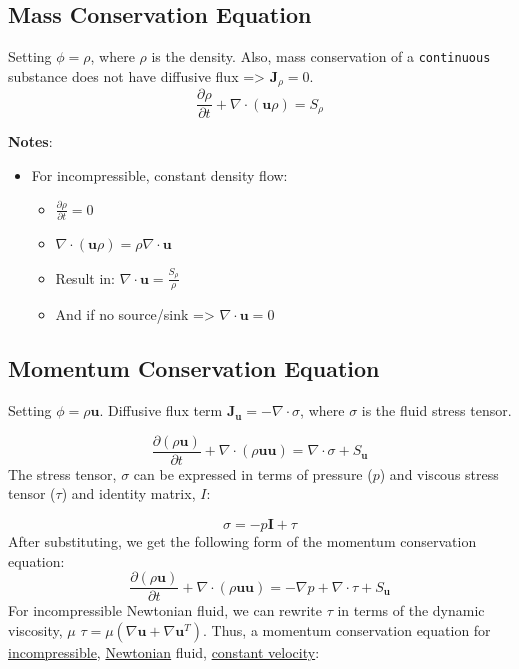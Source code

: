 \documentclass[11pt]{article}
\begin{document}
\subsection{Mass Conservation Equation}
\label{sec:org8221a48}
Setting \(\phi = \rho\), where \(\rho\) is the density. Also, mass conservation of a \texttt{continuous} substance does not
have diffusive flux => \(\textbf{J}_\rho = 0\).
\begin{equation}
\frac{\partial \rho}{\partial t} + \nabla \cdot (\textbf{u}\rho) = S_\rho
\end{equation}

\textbf{Notes}:
\begin{itemize}
\item For incompressible, constant density flow:
\begin{itemize}
\item \(\frac{\partial \rho}{\partial t} = 0\)
\item \(\nabla \cdot (\textbf{u}\rho) = \rho \nabla \cdot \textbf{u}\)
\item Result in: \(\nabla \cdot \textbf{u} = \frac{S_\rho}{\rho}\)
\item And if no source/sink => \(\nabla \cdot \textbf{u} = 0\)
\end{itemize}
\end{itemize}

\subsection{Momentum Conservation Equation}
\label{sec:org6e7f4d1}
Setting \(\phi = \rho \textbf{u}\). Diffusive flux term \(\textbf{J}_\textbf{u} = -\nabla \cdot \sigma\), where
\(\sigma\) is the fluid stress tensor. 

\begin{equation}
\frac{\partial (\rho \textbf{u})}{\partial t} + \nabla \cdot (\rho \textbf{uu})  = \nabla \cdot \sigma +
S_\textbf{u}
\end{equation}
The stress tensor, \(\sigma\) can be expressed in terms of pressure (\(p\)) and viscous stress tensor (\(\tau\))
and identity matrix, \(I\):

\begin{equation}
\sigma = -p\textbf{I} + \tau
\end{equation}
After substituting, we get the following form of the momentum conservation equation:
\begin{equation}
\frac{\partial (\rho \textbf{u})}{\partial t} + \nabla \cdot (\rho \textbf{uu})  = -\nabla p + \nabla \cdot \tau
+ S_\textbf{u}
\end{equation}
For incompressible Newtonian fluid, we can rewrite \(\tau\) in terms of the dynamic viscosity, \(\mu\)
\(\tau = \mu(\nabla \textbf{u}+\nabla \textbf{u}^T)\).  Thus, a momentum conservation equation for \uline{incompressible},
\uline{Newtonian} fluid, \uline{constant velocity}:
\end{document}
